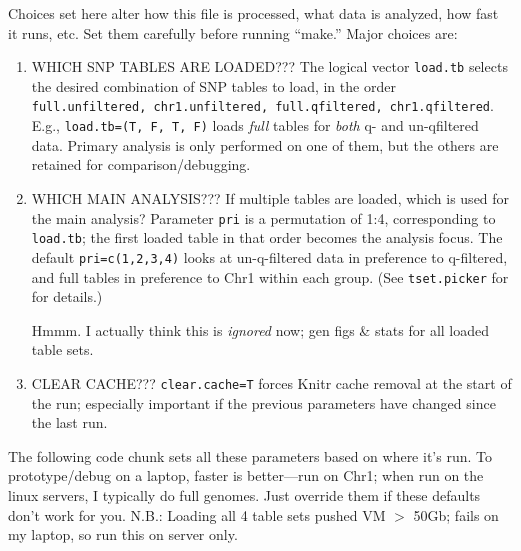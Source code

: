 \documentclass{article}\usepackage[]{graphicx}\usepackage[]{color}
\begin{document}
Choices set here alter how this file is processed, what data is analyzed, how fast it runs, etc.  
Set them carefully before running ``make.''  Major choices are:
\begin{enumerate}

  \item WHICH SNP TABLES ARE LOADED???  The logical vector {\tt load.tb} selects the desired 
    combination of SNP tables to load, in the  order
      {\tt full.unfiltered, chr1.unfiltered, full.qfiltered,  chr1.qfiltered}.   
    E.g., {\tt load.tb=(T, F, T, F)} loads \emph{full} tables for \emph{both} q- and un-qfiltered 
    data.  Primary analysis is only performed on one of them, but the others are retained for 
    comparison/debugging.
    
  \item WHICH MAIN ANALYSIS???  If multiple tables are loaded, which is used for the main analysis? 
    Parameter {\tt pri} is a permutation of 1:4, corresponding to {\tt load.tb}; the first loaded
    table in that order becomes the analysis focus.  The default {\tt pri=c(1,2,3,4)} looks at 
    un-q-filtered data in preference to q-filtered, and full tables in preference to Chr1 within 
    each group.   (See {\tt tset.picker} for for details.)
    
    Hmmm.  I actually think this is \emph{ignored} now; gen figs \& stats for all loaded table sets.

  \item CLEAR CACHE???  {\tt clear.cache=T} forces Knitr cache removal at the start of the run; 
    especially important if the previous parameters have changed since the last run.

\end{enumerate}
The following code chunk sets all these parameters based on where it's run.  To prototype/debug on a
laptop, faster is better---run on Chr1; when run on the linux servers, I 
typically do full genomes.  Just override them if these defaults don't work for you.  
N.B.: Loading all 4 table sets pushed VM $>$ 50Gb; fails on my laptop, so run this on server only.
\end{document}
